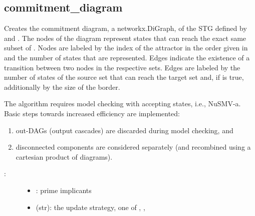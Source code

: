 \documentclass[letterpaper,10pt,english]{sphinxmanual}
\begin{document}
\subsection{commitment\_diagram}
\label{\detokenize{Basins:id6}}\label{\detokenize{Basins:commitment-diagram}}

\begin{fulllineitems}
\label{\detokenize{Basins:PyBoolNet.Basins.commitment_diagram}}
Creates the commitment diagram, a networkx.DiGraph, of the STG defined by  and .
The nodes of the diagram represent states that can reach the exact same subset of .
Nodes are labeled by the index of the attractor in the order given in  and the number of states
that are represented. Edges indicate the existence of a transition between two nodes in the respective sets.
Edges are labeled by the number of states of the source set that can reach the target set and,
if  is true, additionally by the size of the border.

The algorithm requires model checking with accepting states, i.e., NuSMV-a.
Basic steps towards increased efficiency are implemented:
\begin{enumerate}
\item {} 
out-DAGs (output cascades) are discarded during model checking, and

\item {} 
disconnected components are considered separately (and recombined using a cartesian product of diagrams).

\end{enumerate}
\begin{description}
\item[{:}] \leavevmode\begin{itemize}
\item {} 
: prime implicants

\item {} 
 (str): the update strategy, one of , , 


\end{itemize}
\end{description}
\end{fulllineitems}
\end{document}
